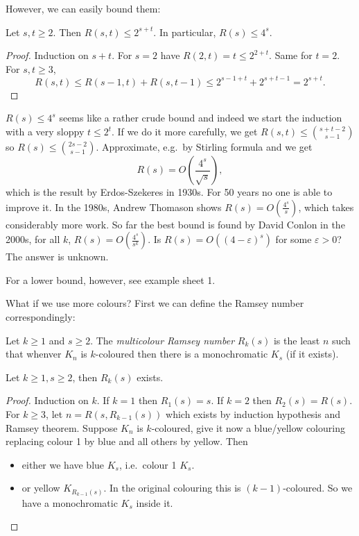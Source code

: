\documentclass[a4paper]{article}
\begin{document}
However, we can easily bound them:

\begin{corollary}
  Let \(s, t \geq 2\). Then \(R(s, t) \leq 2^{s + t}\). In particular, \(R(s) \leq 4^s\).
\end{corollary}

\begin{proof}
  Induction on \(s + t\). For \(s = 2\) have \(R(2, t) = t \leq 2^{2 + t}\). Same for \(t = 2\). For \(s, t \geq 3\),
  \[
    R(s, t) \leq R(s - 1, t) + R(s, t - 1) \leq 2^{s - 1 + t} + 2^{s + t - 1} = 2^{s + t}.
  \]
\end{proof}

\(R(s) \leq 4^s\) seems like a rather crude bound and indeed we start the induction with a very sloppy \(t \leq 2^t\). If we do it more carefully, we get \(R(s, t) \leq \binom{s + t - 2}{s - 1}\) so \(R(s) \leq \binom{2s - 2}{s - 1}\). Approximate, e.g.\ by Stirling formula and we get
\[
  R(s) = O(\frac{4^s}{\sqrt s}),
\]
which is the result by Erdos-Szekeres in 1930s. For 50 years no one is able to improve it. In the 1980s, Andrew Thomason shows \(R(s) = O(\frac{4^s}{s})\), which takes considerably more work. So far the best bound is found by David Conlon in the 2000s, for all \(k\), \(R(s) = O(\frac{4^s}{s^k})\). Is \(R(s) = O((4 - \varepsilon)^s)\) for some \(\varepsilon > 0\)? The answer is unknown.

For a lower bound, however, see example sheet 1.

What if we use more colours? First we can define the Ramsey number correspondingly:

\begin{definition}
  Let \(k \geq 1\) and \(s \geq 2\). The \emph{multicolour Ramsey number} \(R_k(s)\) is the least \(n\) such that whenver \(K_n\) is \(k\)-coloured then there is a monochromatic \(K_s\) (if it exists).
\end{definition}

\begin{theorem}
  Let \(k \geq 1, s \geq 2\), then \(R_k(s)\) exists.
\end{theorem}

\begin{proof}
  Induction on \(k\). If \(k = 1\) then \(R_1(s) = s\). If \(k = 2\) then \(R_2(s) = R(s)\). For \(k \geq 3\), let \(n = R(s, R_{k - 1}(s))\) which exists by induction hypothesis and Ramsey theorem. Suppose \(K_n\) is \(k\)-coloured, give it now a blue/yellow colouring replacing colour 1 by blue and all others by yellow. Then
  \begin{itemize}
  \item either we have blue \(K_s\), i.e.\ colour 1 \(K_s\).
  \item or yellow \(K_{R_{k - 1}(s)}\). In the original colouring this is \((k - 1)\)-coloured. So we have a monochromatic \(K_s\) inside it.
  \end{itemize}
\end{proof}
\end{document}
